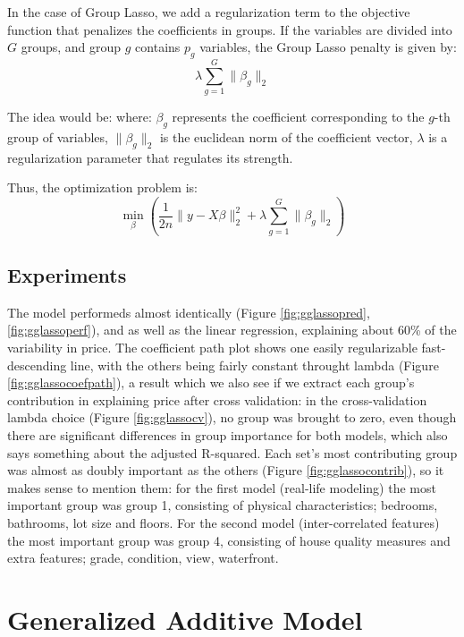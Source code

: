 \documentclass[a4paper, 11pt]{article}
\begin{document}
\begin{multicols}{2}
In the case of Group Lasso, we add a regularization term to the objective function that penalizes the coefficients in groups. If the variables are divided into $G$ groups, and group $g$ contains $p_{g}$ variables, the Group Lasso penalty is given by: \begin{equation} \lambda \sum_{g=1}^{G}\lVert \beta_{g} \rVert_{2}
\end{equation}

The idea would be: where: $\beta_g$ represents the coefficient corresponding to the $g$-th group of variables, $\lVert \beta_g \rVert_2$ is the euclidean norm of the coefficient vector, $\lambda$ is a regularization parameter that regulates its strength.

Thus, the optimization problem is: \begin{equation}
\min_{\beta}\left (\frac{1}{2n}\lVert y-X\beta\rVert^{2}_{2} + \lambda \sum_{g=1}^{G}\lVert \beta_{g} \rVert_{2}\right)
\end{equation}

\subsection{Experiments} \vspace{-3pt}
The model performeds almost identically (Figure \ref{fig:gglassopred}, \ref{fig:gglassoperf}), and as well as the linear regression, explaining about 60\% of the variability in price. The coefficient path plot shows one easily regularizable fast-descending line, with the others being fairly constant throught lambda (Figure \ref{fig:gglassocoefpath}), a result which we also see if we extract each group's contribution in explaining price after cross validation: in the cross-validation lambda choice (Figure \ref{fig:gglassocv}), no group was brought to zero, even though there are significant differences in group importance for both models, which also says something about the adjusted R-squared.
Each set's most contributing group was almost as doubly important as the others (Figure \ref{fig:gglassocontrib}), so it makes sense to mention them: for the first model (real-life modeling) the most important group was group 1, consisting of physical characteristics; bedrooms, bathrooms, lot size and floors. For the second model (inter-correlated features) the most important group was group 4, consisting of house quality measures and extra features; grade, condition, view, waterfront.


\section{Generalized Additive Model}

\end{multicols}
\end{document}
